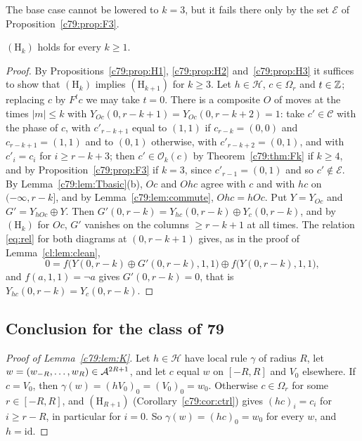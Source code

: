 The base case cannot be lowered to $k=3$, but it fails there only by the set $\mathcal E$ of Proposition~\ref{c79:prop:F3}.

\begin{corollary}\label{c79:cor:ctrl}
$(\mathrm H_k)$ holds for every $k\ge1$.
\end{corollary}

\begin{proof}
By Propositions~\ref{c79:prop:H1}, \ref{c79:prop:H2} and~\ref{c79:prop:H3} it suffices to show that $(\mathrm H_k)$ implies $(\mathrm H_{k+1})$ for $k\ge3$. Let $h\in\mathcal H$, $c\in\Omega_r$ and $t\in\mathbb{Z}$; replacing $c$ by $F^tc$ we may take $t=0$. There is a composite $O$ of moves at the times $|m|\le k$ with $Y_{Oc}(0,r-k+1)=Y_{Oc}(0,r-k+2)=1$: take $c'\in\mathcal C$ with the phase of $c$, with $c'_{r-k+1}$ equal to $(1,1)$ if $c_{r-k}=(0,0)$ and $c_{r-k+1}=(1,1)$ and to $(0,1)$ otherwise, with $c'_{r-k+2}=(0,1)$, and with $c'_i=c_i$ for $i\ge r-k+3$; then $c'\in\mathcal O_k(c)$ by Theorem~\ref{c79:thm:Fk} if $k\ge4$, and by Proposition~\ref{c79:prop:F3} if $k=3$, since $c'_{r-1}=(0,1)$ and so $c'\notin\mathcal E$. By Lemma~\ref{c79:lem:Tbasic}(b), $Oc$ and $Ohc$ agree with $c$ and with $hc$ on $(-\infty,r-k]$, and by Lemma~\ref{c79:lem:commute}, $Ohc=hOc$. Put $Y=Y_{Oc}$ and $G'=Y_{hOc}\oplus Y$. Then $G'(0,r-k)=Y_{hc}(0,r-k)\oplus Y_c(0,r-k)$, and by $(\mathrm H_k)$ for $Oc$, $G'$ vanishes on the columns $\ge r-k+1$ at all times. The relation \eqref{eq:rel} for both diagrams at $(0,r-k+1)$ gives, as in the proof of Lemma~\ref{cl:lem:clean},
\[
0=f\bigl(Y(0,r-k)\oplus G'(0,r-k),1,1\bigr)\oplus f\bigl(Y(0,r-k),1,1\bigr),
\]
and $f(a,1,1)=\neg a$ gives $G'(0,r-k)=0$, that is $Y_{hc}(0,r-k)=Y_c(0,r-k)$.
\end{proof}

\subsection{Conclusion for the class of 79}\label{c79:sec:end}

\begin{proof}[Proof of Lemma~\ref{c79:lem:K}]
Let $h\in\mathcal H$ have local rule $\gamma$ of radius $R$, let $w=(w_{-R},\dots,w_R)\in\mathcal{A}^{2R+1}$, and let $c$ equal $w$ on $[-R,R]$ and $V_0$ elsewhere. If $c=V_0$, then $\gamma(w)=(hV_0)_0=(V_0)_0=w_0$. Otherwise $c\in\Omega_r$ for some $r\in[-R,R]$, and $(\mathrm H_{R+1})$ (Corollary~\ref{c79:cor:ctrl}) gives $(hc)_i=c_i$ for $i\ge r-R$, in particular for $i=0$. So $\gamma(w)=(hc)_0=w_0$ for every $w$, and $h=\mathrm{id}$.
\end{proof}

